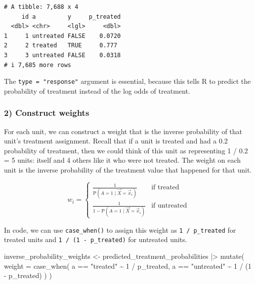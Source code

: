 \documentclass[
  letterpaper,
  DIV=11,
  numbers=noendperiod]{scrartcl}
\newenvironment{Shaded}{\begin{snugshade}}{\end{snugshade}}
\newcommand{\AttributeTok}[1]{\textcolor[rgb]{0.40,0.45,0.13}{#1}}
\newcommand{\DecValTok}[1]{\textcolor[rgb]{0.68,0.00,0.00}{#1}}
\newcommand{\FunctionTok}[1]{\textcolor[rgb]{0.28,0.35,0.67}{#1}}
\newcommand{\NormalTok}[1]{\textcolor[rgb]{0.00,0.23,0.31}{#1}}
\newcommand{\OtherTok}[1]{\textcolor[rgb]{0.00,0.23,0.31}{#1}}
\newcommand{\SpecialCharTok}[1]{\textcolor[rgb]{0.37,0.37,0.37}{#1}}
\newcommand{\StringTok}[1]{\textcolor[rgb]{0.13,0.47,0.30}{#1}}
\begin{document}
\begin{verbatim}
# A tibble: 7,688 x 4
     id a         y     p_treated
  <dbl> <chr>     <lgl>     <dbl>
1     1 untreated FALSE    0.0720
2     2 treated   TRUE     0.777 
3     3 untreated FALSE    0.0318
# i 7,685 more rows
\end{verbatim}

The \texttt{type\ =\ "response"} argument is essential, because this
tells R to predict the probability of treatment instead of the log odds
of treatment.

\subsubsection{2) Construct weights}\label{construct-weights}

For each unit, we can construct a weight that is the inverse probability
of that unit's treatment assignment. Recall that if a unit is treated
and had a 0.2 probability of treatment, then we could think of this unit
as representing 1 / 0.2 = 5 units: itself and 4 others like it who were
not treated. The weight on each unit is the inverse probability of the
treatment value that happened for that unit.

\[
w_i = \begin{cases}
\frac{1}{\text{P}(A = 1\mid \vec{X} = \vec{x}_i)} &\text{if treated} \\
\frac{1}{1 - \text{P}(A = 1\mid \vec{X} = \vec{x}_i)} &\text{if untreated}
\end{cases}
\]

In code, we can use \texttt{case\_when()} to assign this weight as
\texttt{1\ /\ p\_treated} for treated units and
\texttt{1\ /\ (1\ -\ p\_treated)} for untreated units.

\begin{Shaded}
\begin{Highlighting}[]
\NormalTok{inverse\_probability\_weights }\OtherTok{\textless{}{-}}\NormalTok{ predicted\_treatment\_probabilities }\SpecialCharTok{|\textgreater{}}
  \FunctionTok{mutate}\NormalTok{(}
    \AttributeTok{weight =} \FunctionTok{case\_when}\NormalTok{(}
\NormalTok{      a }\SpecialCharTok{==} \StringTok{"treated"} \SpecialCharTok{\textasciitilde{}} \DecValTok{1} \SpecialCharTok{/}\NormalTok{ p\_treated,}
\NormalTok{      a }\SpecialCharTok{==} \StringTok{"untreated"} \SpecialCharTok{\textasciitilde{}} \DecValTok{1} \SpecialCharTok{/}\NormalTok{ (}\DecValTok{1} \SpecialCharTok{{-}}\NormalTok{ p\_treated)}
\NormalTok{    )}
\NormalTok{  )}
\end{Highlighting}
\end{Shaded}
\end{document}
